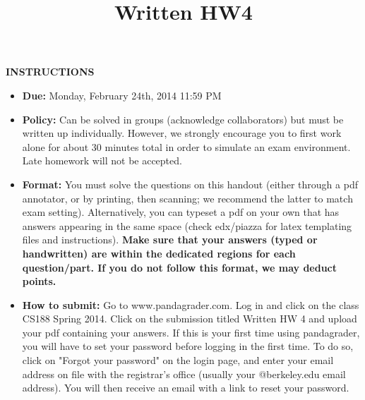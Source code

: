 \documentclass[twoside]{article}
\title{Written HW4}
\begin{document}
\thispagestyle{empty}
\maketitle


\smallskip
\smallskip
\textbf{INSTRUCTIONS}

\begin{itemize}
\item \textbf{Due:} Monday, February 24th, 2014 11:59 PM
\item \textbf{Policy:} Can be solved in groups (acknowledge collaborators) but must
be written up individually. However,
we strongly encourage you to first work alone for about 30 minutes total in order to simulate an exam environment.  Late homework
will not be accepted.
\item \textbf{Format:}
You must solve the questions on this handout (either through a pdf annotator, or by printing, then scanning; we recommend the latter to match exam setting). Alternatively, you can typeset a pdf on your own that has answers appearing in the same space (check edx/piazza for latex templating files and instructions).
\textbf{Make sure that your answers (typed or handwritten) are within the
dedicated regions for each question/part.  If you do not follow this format, we may deduct points.}

\item \textbf{How to submit:}  Go to www.pandagrader.com. Log in and click on the
class CS188 Spring 2014. Click
on the submission titled Written HW 4 and upload your pdf containing your answers. If this is your first time using
pandagrader, you will have to set your password before logging in the
first time.  To do so, click on "Forgot your password" on the login
page, and enter your email address on file with the registrar's office
(usually your @berkeley.edu email address). You will then receive an
email with a link to reset your password.

\end{itemize}
\end{document}
